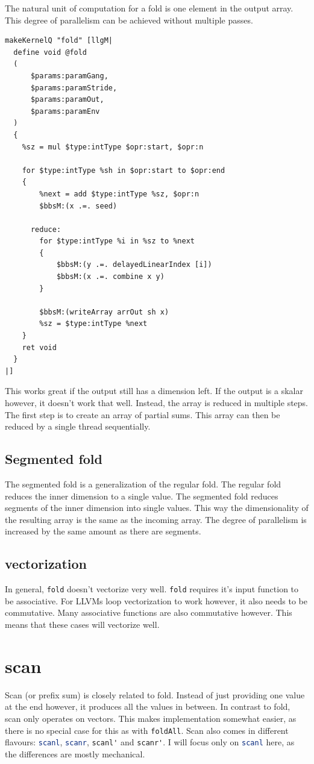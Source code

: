 \documentclass[a4paper,bibliography=totocnumbered,parskip,headsepline]{scrbook}
\begin{document}
The natural unit of computation for a fold is one element in the output array.
This degree of parallelism can be achieved without multiple passes.
\begin{lstlisting}
makeKernelQ "fold" [llgM|
  define void @fold
  (
      $params:paramGang,
      $params:paramStride,
      $params:paramOut,
      $params:paramEnv
  )
  {
    %sz = mul $type:intType $opr:start, $opr:n

    for $type:intType %sh in $opr:start to $opr:end
    {
        %next = add $type:intType %sz, $opr:n
        $bbsM:(x .=. seed)

      reduce:
        for $type:intType %i in %sz to %next
        {
            $bbsM:(y .=. delayedLinearIndex [i])
            $bbsM:(x .=. combine x y)
        }

        $bbsM:(writeArray arrOut sh x)
        %sz = $type:intType %next
    }
    ret void
  }
|]
\end{lstlisting}
This works great if the output still has a dimension left.
If the output is a skalar however, it doesn't work that well.
Instead, the array is reduced in multiple steps.
The first step is to create an array of partial sums.
This array can then be reduced by a single thread sequentially.

\subsection{Segmented fold}
The segmented fold is a generalization of the regular fold.
The regular fold reduces the inner dimension to a single value.
The segmented fold reduces segments of the inner dimension into single values.
This way the dimensionality of the resulting array is the same as the incoming array.
The degree of parallelism is increased by the same amount as there are segments.

\subsection*{vectorization}
In general, \lstinline[language=haskell]!fold! doesn't vectorize very well.
\lstinline[language=haskell]!fold! requires it's input function to be associative.
For LLVMs loop vectorization to work however, it also needs to be commutative.
Many associative functions are also commutative however.
This means that these cases will vectorize well.

\section{scan}
Scan (or prefix sum) is closely related to fold.
Instead of just providing one value at the end however, it produces all the values in between.
In contrast to fold, scan only operates on vectors.
This makes implementation somewhat easier, as there is no special case for this as with \lstinline[language=haskell]!foldAll!.
Scan also comes in different flavours: \lstinline[language=haskell]!scanl!, \lstinline[language=haskell]!scanr!, \lstinline[language=haskell]!scanl'! and \lstinline[language=haskell]!scanr'!.
I will focus only on \lstinline[language=haskell]!scanl! here, as the differences are mostly mechanical.
\end{document}
